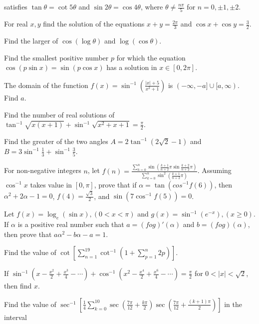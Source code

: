   satisfies $\tan\theta = \cot5\theta$ and $\sin2\theta = \cos4\theta$, where $\theta\ne \frac{n\pi}{5}$ for
  $n = 0, \pm1, \pm2$.
\item For real $x, y$ find the solution of the equations $x + y = \frac{2\pi}{3}$ and $\cos x + \cos y
  = \frac{3}{2}$.
\item Find the larger of $\cos(\log\theta)$ and $\log(\cos\theta)$.
\item Find the smallest positive number $p$ for which the equation $\cos(p\sin x) = \sin(p\cos x)$ has a
  solution in $x\in[0, 2\pi]$.
\item The domain of the function $f(x) = \sin^{-1}\left(\frac{|x| + 5}{x^2 + 1}\right)$ is $(-\infty,
  -a]\cup [a, \infty)$. Find $a$.
\item Find the number of real solutions of $\tan^{-1}\sqrt{x(x + 1)} + \sin^{-1}\sqrt{x^2 + x + 1}
  = \frac{\pi}{2}$.
\item Find the greater of the two angles $A = 2\tan^{-1}\left(2\sqrt{2} - 1\right)$ and $B =
  3\sin^{-1}\frac{1}{3} + \sin^{-1}\frac{3}{5}$.
\item For non-negative integers $n$, let $\displaystyle f(n) = \frac{\displaystyle \sum_{k =
    0}^n\sin\left(\frac{k + 1}{n + 2}\pi\sin\frac{k + 2}{n + 2}\pi\right)}{\displaystyle\sum_{k =
    0}^n\sin^2\left(\frac{k + 1}{n + 2}\pi\right)}$. Assuming $\cos^{-1}x$ takes value in $[0, \pi]$, prove
  that if $\alpha = \tan\left(cos^{-1}f(6)\right)$, then $\alpha^2 + 2\alpha - 1 = 0$, $f(4)
  = \frac{\sqrt{3}}{2}$, and $\sin\left(7\cos^{-1}f(5)\right) = 0$.
\item Let $f(x) = \log_e(\sin x), (0 < x < \pi)$ and $g(x) = \sin^{-1}\left(e^{-x}\right), (x\ge 0)$. If
  $\alpha$ is a positive real number such that $a = (fog)'(\alpha)$ and $b = (fog)(\alpha)$, then prove that
  $a\alpha^2 - b\alpha - a = 1$.
\item Find the value of $\displaystyle\cot\left[\sum_{n = 1}^{19}\cot^{-1}\left(1 + \sum_{p =
    1}^n2p\right)\right]$.
\item If $\sin^{-1}\left(x - \frac{x^2}{2} + \frac{x^3}{4}- \cdots\right) + \cos^{-1}\left(x^2
  - \frac{x^4}{2} + \frac{x^6}{4} - \cdots\right) = \frac{\pi}{2}$ for $0 < |x| < \sqrt{2}$, then find $x$.
\item Find the value of $\displaystyle\sec^{-1}\left[\frac{1}{4}\sum_{k = 0}^{10}\sec\left(\frac{7\pi}{12}
  + \frac{k\pi}{2}\right)\sec\left(\frac{7\pi}{12} + \frac{(k + 1)\pi}{2}\right)\right]$ in the interval
